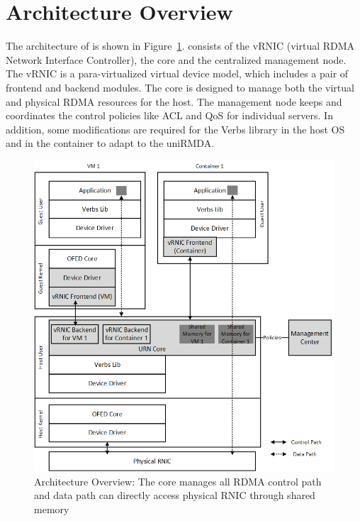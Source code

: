 \section{Architecture Overview}
The architecture of \sys is shown in Figure~\ref{fig:framework-overview}. \sys consists of the vRNIC (virtual RDMA Network Interface Controller), the \sys core and the centralized management node. The vRNIC is a para-virtualized virtual device model, which includes a pair of frontend and backend modules.
The \sys core is designed to manage both the virtual and physical RDMA resources for the host.
The management node keeps and coordinates the control policies like ACL and QoS for individual servers.
In addition, some modifications are required for the Verbs library in the host OS and in the container to adapt to the uniRMDA.

\begin{figure}[!ht]
	\centering
	\includegraphics[width=1\linewidth]{images/framework-overview.png}
	\caption{Architecture Overview: The \sys core manages all RDMA control path and data path can directly access physical RNIC through shared memory}
	\label{fig:framework-overview}
\end{figure}

